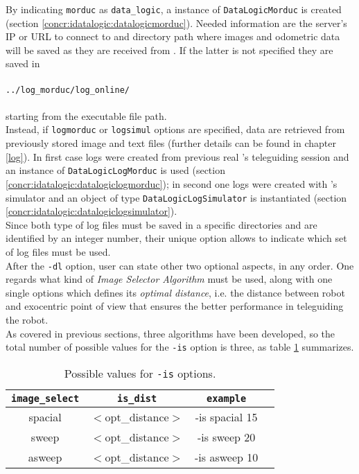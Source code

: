 By indicating \texttt{morduc} as \texttt{data\_logic}, a instance
of \texttt{DataLogicMorduc} is created (section
\ref{concr:idatalogic:datalogicmorduc}). Needed information are
the server's IP or URL to connect to and directory path where images
and odometric data will be saved as they are received from \morduc{}.
If the latter is not specified they are saved in 
\\
\\
\texttt{../log\_morduc/log\_online/}
\\
\\
starting from the executable file path.
\\
Instead, if \texttt{logmorduc} or \texttt{logsimul} options are
specified, data are retrieved from previously stored image and text
files  (further details can be found in chapter \ref{log}).
In first case logs were created from previous real \morduc{}'s
teleguiding session and an instance of \texttt{DataLogicLogMorduc}
is used (section \ref{concr:idatalogic:datalogiclogmorduc});
in second one logs were created with \morduc{}'s simulator and
an object of type \texttt{DataLogicLogSimulator} is instantiated
(section \ref{concr:idatalogic:datalogiclogsimulator}).
\\
Since both type of log files must be saved in a specific directories and
are identified by an integer number, their unique option allows to indicate
which set of log files must be used.
\\
After the \texttt{-dl} option, user can state other two optional
aspects, in any order. One regards what kind of \textit{Image Selector
Algorithm} must be used, along with one single options which defines
its \textit{optimal distance}, i.e. the distance between robot and
exocentric point of view that ensures the better performance in
teleguiding the robot.
\\
As covered in previous sections, three algorithms have been developed,
so the total number of possible values for the \texttt{-is} option
is three, as table \ref{table:isoptions} summarizes.

\begin{table}[!h]
  \centering  
  \begin{tabular}{| c | c | c | c |}

    \hline
    \texttt{image\_select} &
    \texttt{is\_dist} &
    \texttt{example} \\

    \hline
    \small {spacial} &
    \small {$<$opt\_distance$>$} &
    \small{-is spacial 15} \\

    \hline
    \small {sweep} &
    \small {$<$opt\_distance$>$} &
    \small{-is sweep 20} \\

    \hline
    \small {asweep} &
    \small {$<$opt\_distance$>$} &
    \small{-is asweep 10} \\

    \hline

  \end{tabular}
  \caption{Possible values for \texttt{-is} options.}
  \label{table:isoptions}
\end{table}

